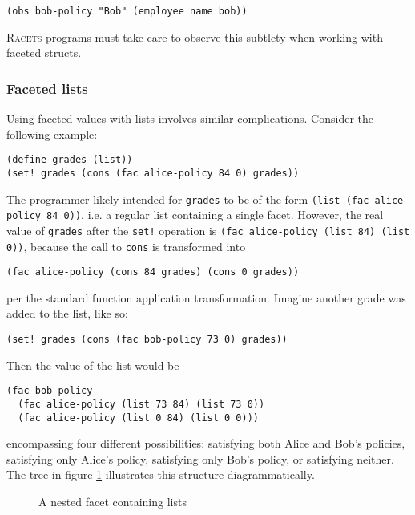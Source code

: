 \documentclass{article}
\begin{document}
\begin{lstlisting}
(obs bob-policy "Bob" (employee name bob))
\end{lstlisting}

\textsc{Racets} programs must take care to observe this subtlety when working with faceted structs.


\subsubsection{Faceted lists}
Using faceted values with lists involves similar complications. Consider the following example:

\begin{lstlisting}
(define grades (list))
(set! grades (cons (fac alice-policy 84 0) grades))
\end{lstlisting}

The programmer likely intended for \texttt{grades} to be of the form \texttt{(list (fac alice-policy 84 0))}, i.e. a regular list containing a single facet. However, the real value of \texttt{grades} after the \texttt{set!} operation is \texttt{(fac alice-policy (list 84) (list 0))}, because the call to \texttt{cons} is transformed into

\begin{lstlisting}
(fac alice-policy (cons 84 grades) (cons 0 grades))
\end{lstlisting}

\noindent per the standard function application transformation. Imagine another grade was added to the list, like so:

\begin{lstlisting}
(set! grades (cons (fac bob-policy 73 0) grades))
\end{lstlisting}

Then the value of the list would be

\begin{lstlisting}
(fac bob-policy
  (fac alice-policy (list 73 84) (list 73 0))
  (fac alice-policy (list 0 84) (list 0 0)))
\end{lstlisting}

\noindent encompassing four different possibilities: satisfying both Alice and Bob's policies, satisfying only Alice's policy, satisfying only Bob's policy, or satisfying neither. The tree in figure \ref{figure:nested-list} illustrates this structure diagrammatically.

\begin{figure}[h]
\begin{center}
	\caption{A nested facet containing lists}
	\label{figure:nested-list}
\end{center}
\end{figure}
\end{document}
